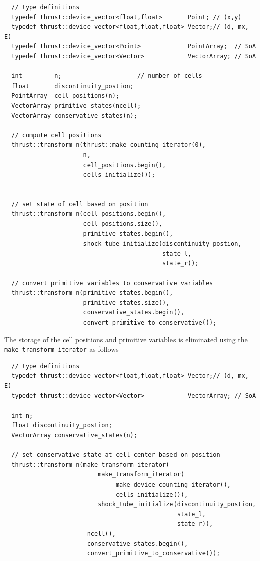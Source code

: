 \begin{lstlisting}
  // type definitions
  typedef thrust::device_vector<float,float>       Point; // (x,y)
  typedef thrust::device_vector<float,float,float> Vector;// (d, mx, E)
  typedef thrust::device_vector<Point>             PointArray;  // SoA
  typedef thrust::device_vector<Vector>            VectorArray; // SoA

  int         n;                     // number of cells
  float       discontinuity_postion;
  PointArray  cell_positions(n);
  VectorArray primitive_states(ncell);
  VectorArray conservative_states(n);

  // compute cell positions 
  thrust::transform_n(thrust::make_counting_iterator(0),
                      n,
                      cell_positions.begin(),
                      cells_initialize());
  			  
  
  // set state of cell based on position                 
  thrust::transform_n(cell_positions.begin(),
                      cell_positions.size(),
                      primitive_states.begin(),
                      shock_tube_initialize(discontinuity_postion,
                                            state_l,
                                            state_r));

  // convert primitive variables to conservative variables
  thrust::transform_n(primitive_states.begin(),
                      primitive_states.size(),
                      conservative_states.begin(),
                      convert_primitive_to_conservative());
\end{lstlisting}
The storage of the cell positions and primitive variables is eliminated using the \\ \verb+make_transform_iterator+ as follows 
\begin{lstlisting}
  // type definitions
  typedef thrust::device_vector<float,float,float> Vector;// (d, mx, E)
  typedef thrust::device_vector<Vector>            VectorArray; // SoA

  int n;
  float discontinuity_postion;
  VectorArray conservative_states(n);

  // set conservative state at cell center based on position
  thrust::transform_n(make_transform_iterator(
                          make_transform_iterator(
                               make_device_counting_iterator(),
                               cells_initialize()),
                          shock_tube_initialize(discontinuity_postion,
                                                state_l,
                                                state_r)),
                       ncell(),
                       conservative_states.begin(),
                       convert_primitive_to_conservative());
\end{lstlisting}
